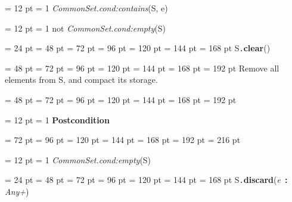 {{{{{{{{\par \pagebreak[3.000000] \noindent \hangindent = 12 pt \hangafter = 1 
 {\em CommonSet.cond:contains\/}(S, e)\par}
{\par \pagebreak[3.000000] \noindent \hangindent = 12 pt \hangafter = 1 
not  {\em CommonSet.cond:empty\/}(S)\par}
\par}
\par}
\par}
\par}
\par}
\par}
{\par \noindent  \leftskip = 24 pt  \leftmargini = 48 pt  \leftmarginii = 72 pt  \leftmarginiii = 96 pt  \leftmarginiv = 120 pt  \leftmarginv = 144 pt  \leftmarginvi = 168 pt S{\tt .\/}{\bf {\large {\bf clear\/}}\/}(){\par \noindent
{\par \noindent  \leftskip = 48 pt  \leftmargini = 72 pt  \leftmarginii = 96 pt  \leftmarginiii = 120 pt  \leftmarginiv = 144 pt  \leftmarginv = 168 pt  \leftmarginvi = 192 pt  Remove all elements from S, and compact its storage.\par}
{\par \noindent  \leftskip = 48 pt  \leftmargini = 72 pt  \leftmarginii = 96 pt  \leftmarginiii = 120 pt  \leftmarginiv = 144 pt  \leftmarginv = 168 pt  \leftmarginvi = 192 pt {\par \noindent
{\par \pagebreak[3.100000] \noindent \hangindent = 12 pt \hangafter = 1 
{\bf Postcondition\/}\par}
{\par \noindent  \leftskip = 72 pt  \leftmargini = 96 pt  \leftmarginii = 120 pt  \leftmarginiii = 144 pt  \leftmarginiv = 168 pt  \leftmarginv = 192 pt  \leftmarginvi = 216 pt {\par \noindent
{\par \pagebreak[3.000000] \noindent \hangindent = 12 pt \hangafter = 1 
 {\em CommonSet.cond:empty\/}(S)\par}
\par}
\par}
\par}
\par}
\par}
\par}
{\par \noindent  \leftskip = 24 pt  \leftmargini = 48 pt  \leftmarginii = 72 pt  \leftmarginiii = 96 pt  \leftmarginiv = 120 pt  \leftmarginv = 144 pt  \leftmarginvi = 168 pt S{\tt .\/}{\bf {\large {\bf discard\/}}\/}({\em e\/}~{\bf :}  {\em Any+\/}){\par \noindent
}}}
